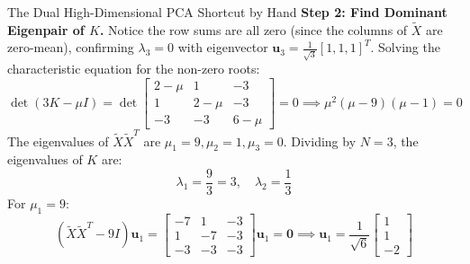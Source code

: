 \begin{examplebox}{The Dual High-Dimensional PCA Shortcut by Hand}
\textbf{Step 2: Find Dominant Eigenpair of $K$.}
Notice the row sums are all zero (since the columns of $\tilde{X}$ are zero-mean), confirming $\lambda_3 = 0$ with eigenvector $\mathbf{u}_3 = \frac{1}{\sqrt{3}}[1, 1, 1]^T$.
Solving the characteristic equation for the non-zero roots:
\begin{equation}
\det(3K - \mu I) = \det\begin{bmatrix} 2 - \mu & 1 & -3 \\ 1 & 2 - \mu & -3 \\ -3 & -3 & 6 - \mu \end{bmatrix} = 0 \implies \mu^2(\mu - 9)(\mu - 1) = 0
\end{equation}
The eigenvalues of $\tilde{X}\tilde{X}^T$ are $\mu_1 = 9, \mu_2 = 1, \mu_3 = 0$.
Dividing by $N = 3$, the eigenvalues of $K$ are:
\begin{equation}
\lambda_1 = \frac{9}{3} = 3, \quad \lambda_2 = \frac{1}{3}
\end{equation}
For $\mu_1 = 9$:
\begin{equation}
(\tilde{X}\tilde{X}^T - 9I)\mathbf{u}_1 = \begin{bmatrix} -7 & 1 & -3 \\ 1 & -7 & -3 \\ -3 & -3 & -3 \end{bmatrix}\mathbf{u}_1 = \mathbf{0} \implies \mathbf{u}_1 = \frac{1}{\sqrt{6}}\begin{bmatrix} 1 \\ 1 \\ -2 \end{bmatrix}
\end{equation}


\end{examplebox}
